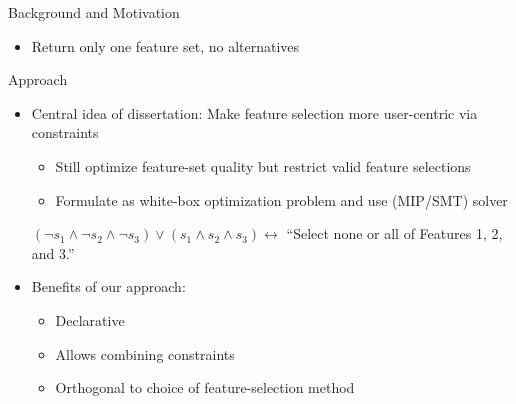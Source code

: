 \documentclass[en, navbarinline, handout]{sdqbeamer}
\begin{document}
\begin{frame}[t]{Background and Motivation}
\begin{itemize}
\begin{itemize}
			\item Return only one feature set, no alternatives
		\end{itemize}
	\end{itemize}
\end{frame}

\begin{frame}[t]{Approach}
	\begin{itemize}
		\item Central idea of dissertation: Make feature selection more user-centric via constraints
		\begin{itemize}
			\item Still optimize feature-set quality but restrict valid feature selections
			\item Formulate as white-box optimization problem and use (MIP/SMT) solver
		\end{itemize}
		\pause
		\begin{example}
			$(\lnot s_1 \land \lnot s_2 \land \lnot s_3) \lor (s_1 \land s_2 \land s_3) \leftrightarrow$ ``Select none or all of Features 1, 2, and 3.''
		\end{example}
		\pause
		\vspace{0.5\baselineskip}
		\item Benefits of our approach:
		\begin{itemize}
			\item Declarative
			\item Allows combining constraints
			\item Orthogonal to choice of feature-selection method
		\end{itemize}
	\end{itemize}
\end{frame}
\end{document}
